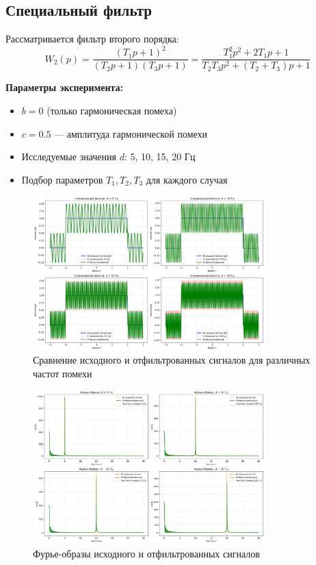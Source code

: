 \subsection*{Специальный фильтр}

Рассматривается фильтр второго порядка:
\begin{equation}
W_2(p) = \frac{(T_1 p + 1)^2}{(T_2 p + 1)(T_3 p + 1)} = \frac{T_1^2 p^2 + 2T_1 p + 1}{T_2 T_3 p^2 + (T_2 + T_3) p + 1}
\end{equation}

\textbf{Параметры эксперимента:}
\begin{itemize}
    \item $b = 0$ (только гармоническая помеха)
    \item $c = 0.5$ — амплитуда гармонической помехи
    \item Исследуемые значения $d$: 5, 10, 15, 20 Гц
    \item Подбор параметров $T_1, T_2, T_3$ для каждого случая
\end{itemize}

\begin{figure}[H]
    \centering
    \includegraphics[width=0.8\textwidth]{images/task2/special_filter_time_domain.png}
    \caption{Сравнение исходного и отфильтрованных сигналов для различных частот помехи}
    \label{fig:special_filter_time}
\end{figure}

\begin{figure}[H]
    \centering
    \includegraphics[width=0.8\textwidth]{images/task2/special_filter_freq_domain.png}
    \caption{Фурье-образы исходного и отфильтрованных сигналов}
    \label{fig:special_filter_freq}
\end{figure}

